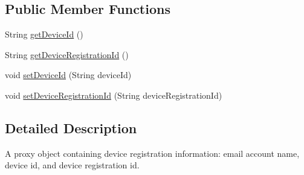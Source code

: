 \subsection*{Public Member Functions}
\begin{DoxyCompactItemize}
\item 
String \hyperlink{interfacecsc440_1_1nuf_1_1shared_1_1_registration_info_proxy_a191f88f1a01a822e48621a18782899be}{get\-Device\-Id} ()
\item 
String \hyperlink{interfacecsc440_1_1nuf_1_1shared_1_1_registration_info_proxy_ab7a087a6ff53a38fa068ced739959f4b}{get\-Device\-Registration\-Id} ()
\item 
void \hyperlink{interfacecsc440_1_1nuf_1_1shared_1_1_registration_info_proxy_a3d96be9a03c6aa4547a680419561baff}{set\-Device\-Id} (String device\-Id)
\item 
void \hyperlink{interfacecsc440_1_1nuf_1_1shared_1_1_registration_info_proxy_adfd37626741163e3b5b1e815af150e23}{set\-Device\-Registration\-Id} (String device\-Registration\-Id)
\end{DoxyCompactItemize}


\subsection{Detailed Description}
A proxy object containing device registration information\-: email account name, device id, and device registration id. 

